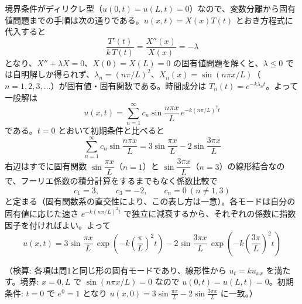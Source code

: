 
境界条件がディリクレ型（$u(0,t)=u(L,t)=0$）なので、変数分離から固有値問題までの手順は次の通りである。$u(x,t)=X(x)T(t)$ とおき方程式に代入すると
\[
\frac{T'(t)}{k\,T(t)} = \frac{X''(x)}{X(x)} = -\lambda
\]
となり、$X''+\lambda X=0$、$X(0)=X(L)=0$ の固有値問題を解くと、$\lambda \le 0$ では自明解しか得られず、$\lambda_n=(n\pi/L)^2$、$X_n(x)=\sin(n\pi x/L)$（$n=1,2,3,\dots$）が固有値・固有関数である。時間成分は $T_n(t)=e^{-k\lambda_n t}$。よって一般解は
\[
u(x,t) = \sum_{n=1}^\infty c_n \sin\frac{n\pi x}{L}\,e^{-k(n\pi/L)^2 t}
\]
である。$t = 0$ とおいて初期条件と比べると
\[
\sum_{n=1}^\infty c_n \sin\frac{n\pi x}{L} = 3\sin\frac{\pi x}{L} - 2\sin\frac{3\pi x}{L}
\]
右辺はすでに固有関数 $\sin\dfrac{\pi x}{L}$（$n=1$）と $\sin\dfrac{3\pi x}{L}$（$n=3$）の線形結合なので、フーリエ係数の積分計算をするまでもなく係数比較で
\[
c_1 = 3, \qquad c_3 = -2, \qquad c_n = 0\ (n \neq 1, 3)
\]
と定まる（固有関数系の直交性により、この表し方は一意）。各モードは自分の固有値に応じた速さ $e^{-k(n\pi/L)^2 t}$ で独立に減衰するから、それぞれの係数に指数因子を付ければよい。よって
\[
\boxed{\; u(x,t) = 3\sin\frac{\pi x}{L}\,\exp\!\left(-k\left(\frac{\pi}{L}\right)^{2} t\right) - 2\sin\frac{3\pi x}{L}\,\exp\!\left(-k\left(\frac{3\pi}{L}\right)^{2} t\right) \;}
\]

（検算: 各項は問1と同じ形の固有モードであり、線形性から $u_t = k u_{xx}$ を満たす。境界: $x=0,L$ で $\sin(n\pi x/L)=0$ なので $u(0,t)=u(L,t)=0$。初期条件: $t=0$ で $e^{0}=1$ となり $u(x,0)=3\sin\frac{\pi x}{L}-2\sin\frac{3\pi x}{L}$ に一致。）

